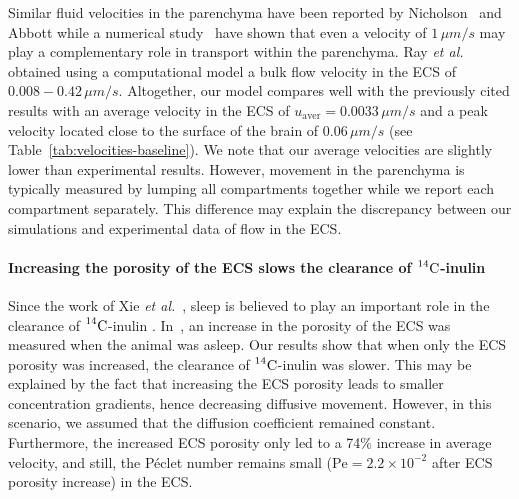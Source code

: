 \documentclass[a4paper,11pt]{article}
\newcommand{\etal}{\emph{et al.}\;}
\newcommand{\1}{^{(1)}}
\newcommand{\2}{^{(2)}}
\newcommand{\Cinulin}{$\prescript{14}{}{\text{C}}$-inulin }
\begin{document}
Similar fluid velocities in the parenchyma have been reported by Nicholson~\cite{nicholson2001diffusion} and Abbott \cite{abbott2004evidence} while a numerical study~\cite{croci2019uncertainty} have shown that even a velocity of $1 \,\si{\mu m/s}$  may play a complementary role in transport within the parenchyma.
Ray \etal~\cite{ray_analysis_2019} obtained using a computational model a bulk flow velocity in the ECS of $0.008-0.42\,\si{\mu m/s}$. Altogether, our model compares well with the previously cited results with an average velocity in the ECS of $u_\text{aver} = 0.0033 \,\si{\mu m/s}$ and a peak velocity located close to the surface of the brain of $0.06 \,\si{\mu m/s}$ (see Table~\ref{tab:velocities-baseline}). We note that our average velocities are slightly lower than experimental results. However, movement in the parenchyma is typically measured by lumping all compartments together while we report each compartment separately. This difference may explain the discrepancy between our simulations and experimental data of flow in the ECS. 


\paragraph{Increasing the porosity of the ECS slows the clearance of \Cinulin}

Since the work of Xie \etal~\cite{Xie_2013_sleep}, sleep is believed to play an important role in the clearance of \Cinulin. In~\cite{Xie_2013_sleep}, an increase in the porosity of the ECS was measured when the animal was asleep. 
Our results show that when only the ECS porosity was increased, the clearance of \Cinulin was slower. This may be explained by the fact that increasing the ECS porosity leads to smaller concentration gradients, hence decreasing diffusive movement. However, in this scenario, we assumed that the diffusion coefficient remained constant. 
Furthermore, the increased ECS porosity only led to a 74\% increase in average velocity, and still, the P\'eclet number remains small ($\text{Pe} = 2.2 \times 10^{-2}$ after ECS porosity increase) in the ECS.
\end{document}
